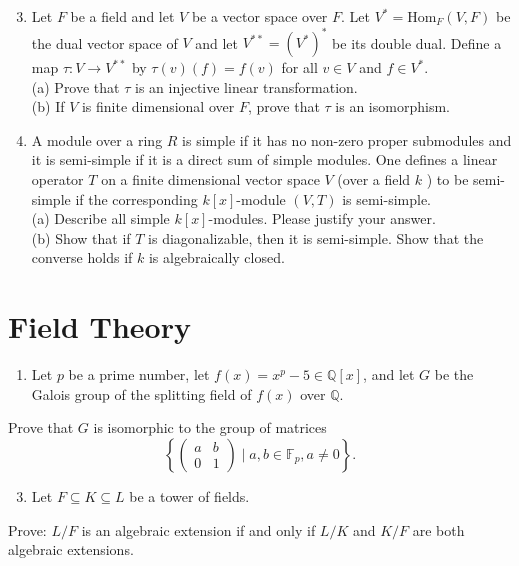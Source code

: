 \documentclass[10pt]{article}
\begin{document}
\begin{enumerate}
  \setcounter{enumi}{2}
  \item Let $F$ be a field and let $V$ be a vector space over $F$. Let $V^{*}=\mathrm{Hom}_{F}(V, F)$ be the dual vector space of $V$ and let $V^{* *}=\left(V^{*}\right)^{*}$ be its double dual. Define a map $\tau: V \rightarrow V^{* *}$ by $\tau(v)(f)=f(v)$ for all $v \in V$ and $f \in V^{*}$.\\
(a) Prove that $\tau$ is an injective linear transformation.\\
(b) If $V$ is finite dimensional over $F$, prove that $\tau$ is an isomorphism.

  \item A module over a ring $R$ is simple if it has no non-zero proper submodules and it is semi-simple if it is a direct sum of simple modules. One defines a linear operator $T$ on a finite dimensional vector space $V$ (over a field $k$ ) to be semi-simple if the corresponding $k[x]$-module $(V, T)$ is semi-simple.\\
(a) Describe all simple $k[x]$-modules. Please justify your answer.\\
(b) Show that if $T$ is diagonalizable, then it is semi-simple. Show that the converse holds if $k$ is algebraically closed.

\end{enumerate}
\section{Field Theory}
\begin{enumerate}
  \item Let $p$ be a prime number, let $f(x)=x^{p}-5 \in \mathbb{Q}[x]$, and let $G$ be the Galois group of the splitting field of $f(x)$ over $\mathbb{Q}$.
\end{enumerate}
Prove that $G$ is isomorphic to the group of matrices
$$
\left\{\left(\begin{array}{ll}
a & b \\
0 & 1
\end{array}\right) \mid a, b \in \mathbb{F}_{p}, a \neq 0\right\} .
$$

\begin{enumerate}
  \setcounter{enumi}{2}
  \item Let $F \subseteq K \subseteq L$ be a tower of fields.
\end{enumerate}
Prove: $L / F$ is an algebraic extension if and only if $L / K$ and $K / F$ are both algebraic extensions.
\end{document}
